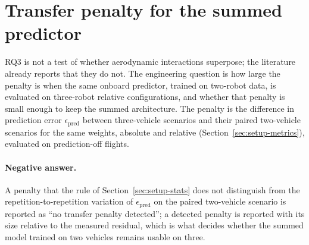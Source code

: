 
\section{Transfer penalty for the summed predictor}
\label{sec:res3-transfer}

RQ3 is not a test of whether aerodynamic interactions superpose; the literature already reports that
they do not. The engineering question is how large the penalty is when the same onboard predictor,
trained on two-robot data, is evaluated on three-robot relative configurations, and whether that
penalty is small enough to keep the summed architecture. The penalty is the difference in
prediction error $\epsilon_{\mathrm{pred}}$ between three-vehicle scenarios and their paired
two-vehicle scenarios for the same weights, absolute and relative
(Section~\ref{sec:setup-metrics}), evaluated on prediction-off flights.



\paragraph{Negative answer.} A penalty that the rule of Section~\ref{sec:setup-stats} does not
distinguish from the repetition-to-repetition variation of $\epsilon_{\mathrm{pred}}$ on the paired
two-vehicle scenario is reported as ``no transfer penalty detected''; a detected penalty is reported
with its size relative to the measured residual, which is what decides whether the summed model
trained on two vehicles remains usable on three.

